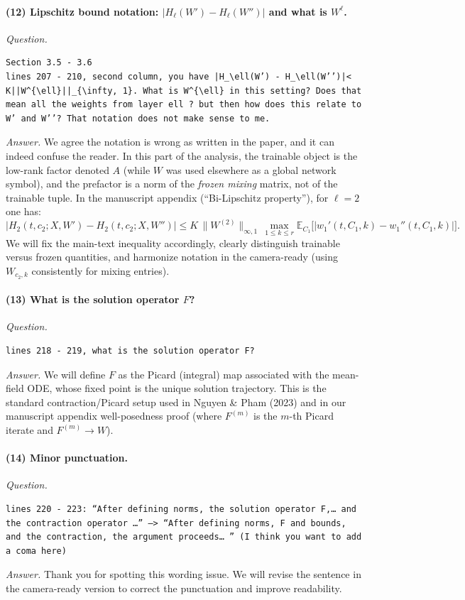\documentclass[11pt,a4paper]{article}
\newcommand{\NP}{Nguyen \& Pham (2023)}
\begin{document}
\paragraph{(12) Lipschitz bound notation: $|H_\ell(W')-H_\ell(W'')|$ and what is $W^{\ell}$.}
\textit{Question.}\par
\begin{verbatim}
Section 3.5 - 3.6
lines 207 - 210, second column, you have |H_\ell(W’) - H_\ell(W’’)|< K||W^{\ell}||_{\infty, 1}. What is W^{\ell} in this setting? Does that mean all the weights from layer ell ? but then how does this relate to W’ and W’’? That notation does not make sense to me.
\end{verbatim}
\textit{Answer.} We agree the notation is wrong as written in the paper, and it can indeed confuse the reader. In this part of the analysis, the trainable object is the low-rank factor denoted $A$ (while $W$ was used elsewhere as a global network symbol), and the prefactor is a norm of the \emph{frozen mixing} matrix, not of the trainable tuple. In the manuscript appendix (``Bi-Lipschitz property''), for $\ell=2$ one has:
\[
\big|H_2(t,c_2;X,W')-H_2(t,c_2;X,W'')\big|
\le
K\,\|W^{(2)}\|_{\infty,1}\,\max_{1\le k\le r}\mathbb{E}_{C_1}\big[|w_1'(t,C_1,k)-w_1''(t,C_1,k)|\big].
\]
We will fix the main-text inequality accordingly, clearly distinguish trainable versus frozen quantities, and harmonize notation in the camera-ready (using $W_{c_2,k}$ consistently for mixing entries).

\paragraph{(13) What is the solution operator $F$?}
\textit{Question.}\par
\begin{verbatim}
lines 218 - 219, what is the solution operator F?
\end{verbatim}
\textit{Answer.} We will define $F$ as the Picard (integral) map associated with the mean-field ODE, whose fixed point is the unique solution trajectory. This is the standard contraction/Picard setup used in \NP{} and in our manuscript appendix well-posedness proof (where $F^{(m)}$ is the $m$-th Picard iterate and $F^{(m)}\to W$).

\paragraph{(14) Minor punctuation.}
\textit{Question.}\par
\begin{verbatim}
lines 220 - 223: “After defining norms, the solution operator F,… and the contraction operator …” —> “After defining norms, F and bounds, and the contraction, the argument proceeds… ” (I think you want to add a coma here)
\end{verbatim}
\textit{Answer.} Thank you for spotting this wording issue. We will revise the sentence in the camera-ready version to correct the punctuation and improve readability.
\end{document}
